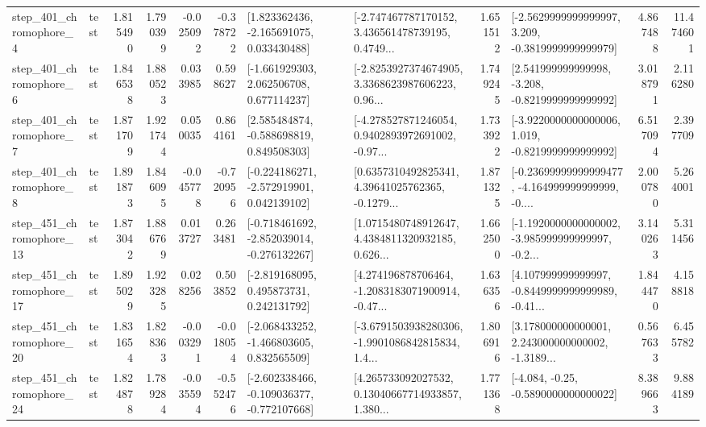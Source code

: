 \begin{tabular}{llrrrrllrlrr}
   step\_401\_chromophore\_4 &      test &      1.815490 &    1.790399 &     -0.025092 & -0.378722 &    [1.823362436, -2.165691075, 0.033430488] &  [-2.747467787170152, 3.436561478739195, 0.4749... &       1.651512 &  [-2.5629999999999997, 3.209, -0.3819999999999979] &            4.867488 &         11.474601 \\
   step\_401\_chromophore\_6 &      test &      1.846538 &    1.880523 &      0.033985 &  0.598627 &    [-1.661929303, 2.062506708, 0.677114237] &  [-2.8253927374674905, 3.3368623987606223, 0.96... &       1.749245 &   [2.541999999999998, -3.208, -0.8219999999999992] &            3.018791 &          2.116280 \\
   step\_401\_chromophore\_7 &      test &      1.871709 &    1.921744 &      0.050035 &  0.864161 &    [2.585484874, -0.588698819, 0.849508303] &  [-4.278527871246054, 0.9402893972691002, -0.97... &       1.733922 &  [-3.9220000000000006, 1.019, -0.8219999999999992] &            6.517094 &          2.397709 \\
   step\_401\_chromophore\_8 &      test &      1.891873 &    1.846095 &     -0.045778 & -0.720956 &   [-0.224186271, -2.572919901, 0.042139102] &  [0.6357310492825341, 4.39641025762365, -0.1279... &       1.871325 &  [-0.23699999999999477, -4.164999999999999, -0.... &            2.000780 &          5.264001 \\
  step\_451\_chromophore\_13 &      test &      1.873042 &    1.886769 &      0.013727 &  0.263481 &  [-0.718461692, -2.852039014, -0.276132267] &  [1.0715480748912647, 4.4384811320932185, 0.626... &       1.662500 &  [-1.1920000000000002, -3.985999999999997, -0.2... &            3.140263 &          5.311456 \\
  step\_451\_chromophore\_17 &      test &      1.895029 &    1.923285 &      0.028256 &  0.503852 &    [-2.819168095, 0.495873731, 0.242131792] &  [4.274196878706464, -1.2083183071900914, -0.47... &       1.636356 &  [4.107999999999997, -0.8449999999999989, -0.41... &            1.844470 &          4.158818 \\
  step\_451\_chromophore\_20 &      test &      1.831654 &    1.828363 &     -0.003291 & -0.018054 &   [-2.068433252, -1.466803605, 0.832565509] &  [-3.6791503938280306, -1.9901086842815834, 1.4... &       1.806916 &  [3.178000000000001, 2.243000000000002, -1.3189... &            0.567633 &          6.455782 \\
  step\_451\_chromophore\_24 &      test &      1.824878 &    1.789284 &     -0.035594 & -0.552476 &  [-2.602338466, -0.109036377, -0.772107668] &  [4.265733092027532, 0.13040667714933857, 1.380... &       1.771368 &               [-4.084, -0.25, -0.5890000000000022] &            8.389663 &          9.884189 \\

\end{tabular}

